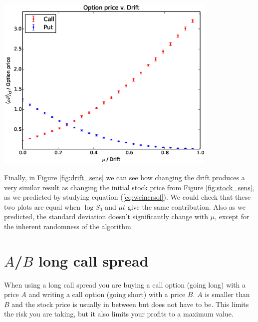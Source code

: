 \documentclass[8 pt]{article}
\newenvironment{Figure}
  {\par\medskip\noindent\minipage{\linewidth}}
  {\endminipage\par\medskip}
\begin{document}
\begin{multicols*}{2}
\begin{Figure}
  \begin{center}
    \includegraphics[width=0.8\textwidth]{graphs/oP_drift.eps}
    \label{fig:drift_sens}
  \end{center}
\end{Figure}

Finally, in Figure \ref{fig:drift_sens} we can see how changing the drift produces a very similar result as changing the initial stock price from Figure \ref{fig:stock_sens}, as we predicted by studying equation (\ref{eq:weinersol}). We could check that these two plots are equal when $\log S_0$ and $\mu t$ give the same contribution. Also as we predicted, the standard deviation doesn't significantly change with $\mu$, except for the inherent randomness of the algorithm.

\section{$A$/$B$ long call spread}

When using a long call spread you are buying a call option (going long) with a price $A$ and writing a call option (going short) with a price $B$. $A$ is smaller than $B$ and the stock price is usually in between but does not have to be. This limits the risk you are taking, but it also limits your profits to a maximum value.


\end{multicols*}
\end{document}
